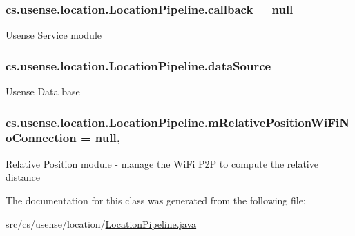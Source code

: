 \subsubsection[{callback}]{ cs.\+usense.\+location.\+Location\+Pipeline.\+callback = null\hspace{0.3cm}{\ttfamily [private]}}\label{classcs_1_1usense_1_1location_1_1_location_pipeline_afecd4991b4fa95094242d329b3896b0e}
Usense Service module \hypertarget{classcs_1_1usense_1_1location_1_1_location_pipeline_ab13c3ed8bfbbd1f4af74d6cb884a9732}{}
\subsubsection[{data\+Source}]{ cs.\+usense.\+location.\+Location\+Pipeline.\+data\+Source\hspace{0.3cm}{\ttfamily [private]}}\label{classcs_1_1usense_1_1location_1_1_location_pipeline_ab13c3ed8bfbbd1f4af74d6cb884a9732}
Usense Data base \hypertarget{classcs_1_1usense_1_1location_1_1_location_pipeline_a548f9c55534e4b5263749aab0f73d930}{}
\subsubsection[{m\+Relative\+Position\+Wi\+Fi\+No\+Connection}]{ cs.\+usense.\+location.\+Location\+Pipeline.\+m\+Relative\+Position\+Wi\+Fi\+No\+Connection = null\hspace{0.3cm}{\ttfamily [static]}, {\ttfamily [private]}}\label{classcs_1_1usense_1_1location_1_1_location_pipeline_a548f9c55534e4b5263749aab0f73d930}
Relative Position module -\/ manage the Wi\+Fi P2\+P to compute the relative distance 

The documentation for this class was generated from the following file\+:\begin{DoxyCompactItemize}
\item 
src/cs/usense/location/\hyperlink{_location_pipeline_8java}{Location\+Pipeline.\+java}\end{DoxyCompactItemize}
